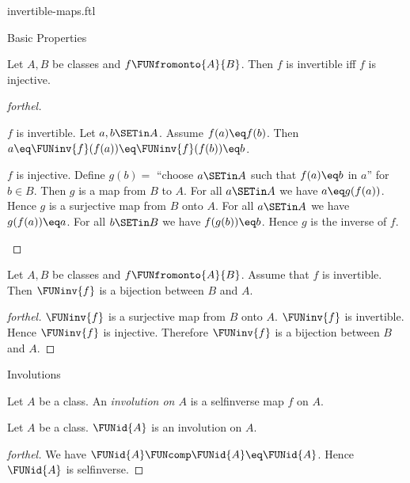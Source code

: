 \documentclass{stex}
\begin{document}
\begin{smodule}{invertible-maps.ftl}
\begin{sfragment}{Basic Properties}
  \begin{proposition}[forthel,id=FOUNDATIONS_09_6777575974109184]
    Let $A, B$ be classes and $f \FUNfromonto{A}{B}$.
    Then $f$ is invertible iff $f$ is injective.
  \end{proposition}
  \begin{proof}[forthel]
    \begin{case}{$f$ is invertible.}
      Let $a, b \SETin A$.
      Assume $f(a) \eq f(b)$.
      Then $a \eq \FUNinv{f}(f(a)) \eq \FUNinv{f}(f(b)) \eq b$.
    \end{case}

    \begin{case}{$f$ is injective.}
      Define $g(b) =$ ``choose $a \SETin A$ such that $f(a) \eq b$ in $a$'' for
      $b \in B$.
      Then $g$ is a map from $B$ to $A$.
      For all $a \SETin A$ we have $a \eq g(f(a))$.
      Hence $g$ is a surjective map from $B$ onto $A$.
      For all $a \SETin A$ we have $g(f(a)) \eq a$.
      For all $b \SETin B$ we have $f(g(b)) \eq b$.
      Hence $g$ is the inverse of $f$.
    \end{case}
  \end{proof}

  \begin{corollary}[forthel,id=FOUNDATIONS_09_5708971514003456]
    Let $A, B$ be classes and $f \FUNfromonto{A}{B}$.
    Assume that $f$ is invertible.
    Then $\FUNinv{f}$ is a bijection between $B$ and $A$.
  \end{corollary}
  \begin{proof}[forthel]
    $\FUNinv{f}$ is a surjective map from $B$ onto $A$.
    $\FUNinv{f}$ is invertible.
    Hence $\FUNinv{f}$ is injective.
    Therefore $\FUNinv{f}$ is a bijection between $B$ and $A$.
  \end{proof}
\end{sfragment}

\begin{sfragment}{Involutions}
  \begin{definition}[forthel,id=FOUNDATIONS_09_7282039688527872]
    Let $A$ be a class.
    An \emph{involution on $A$} is a selfinverse map $f$ on $A$.
  \end{definition}

  \begin{proposition}[forthel,id=FOUNDATIONS_09_7944474185433088]
    Let $A$ be a class.
    $\FUNid{A}$ is an involution on $A$.
  \end{proposition}
  \begin{proof}[forthel]
    We have $\FUNid{A} \FUNcomp \FUNid{A} \eq \FUNid{A}$.
    Hence $\FUNid{A}$ is selfinverse.
  \end{proof}


\end{sfragment}
\end{smodule}
\end{document}
